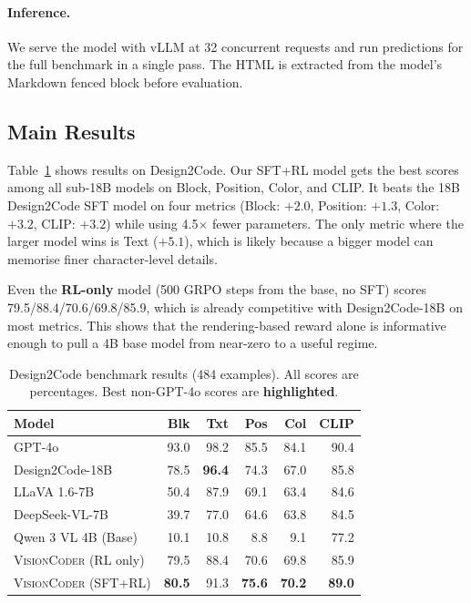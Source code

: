 \documentclass[10pt,twocolumn,letterpaper]{article}
\newcommand{\best}[1]{\textbf{\textcolor{bestcol}{#1}}}
\newcommand{\model}[1]{\textsc{#1}}
\begin{document}
\paragraph{Inference.}
We serve the model with vLLM at 32 concurrent requests and run predictions
for the full benchmark in a single pass.  The HTML is extracted from the
model's Markdown fenced block before evaluation.

\subsection{Main Results}

Table~\ref{tab:results} shows results on Design2Code.  Our SFT+RL model gets
the best scores among all sub-18B models on Block, Position, Color, and CLIP.
It beats the 18B Design2Code SFT model on four metrics (Block: $+2.0$,
Position: $+1.3$, Color: $+3.2$, CLIP: $+3.2$) while using 4.5$\times$
fewer parameters.  The only metric where the larger model wins is Text ($+5.1$),
which is likely because a bigger model can memorise finer character-level
details.

Even the \textbf{RL-only} model (500 GRPO steps from the base, no SFT)
scores 79.5/88.4/70.6/69.8/85.9, which is already competitive with
Design2Code-18B on most metrics.  This shows that the rendering-based reward
alone is informative enough to pull a 4B base model from near-zero to a
useful regime.

\begin{table}[t]
\centering
\caption{Design2Code benchmark results (484 examples). All scores are
percentages. Best non-GPT-4o scores are \best{highlighted}.}
\label{tab:results}
\renewcommand{\arraystretch}{1.1}
\setlength{\tabcolsep}{3pt}
\footnotesize
\begin{tabular}{lrrrrr}
\toprule
\textbf{Model} & \textbf{Blk} & \textbf{Txt} & \textbf{Pos} & \textbf{Col} & \textbf{CLIP} \\
\midrule
GPT-4o             & 93.0 & 98.2 & 85.5 & 84.1 & 90.4 \\
\midrule
Design2Code-18B    & 78.5 & \best{96.4} & 74.3 & 67.0 & 85.8 \\
LLaVA 1.6-7B       & 50.4 & 87.9 & 69.1 & 63.4 & 84.6 \\
DeepSeek-VL-7B     & 39.7 & 77.0 & 64.6 & 63.8 & 84.5 \\
Qwen 3 VL 4B (Base)& 10.1 & 10.8 &  8.8 &  9.1 & 77.2 \\
\midrule
\model{VisionCoder} (RL only)   & 79.5 & 88.4 & 70.6 & 69.8 & 85.9 \\
\model{VisionCoder} (SFT+RL)    & \best{80.5} & 91.3 & \best{75.6} & \best{70.2} & \best{89.0} \\
\bottomrule
\end{tabular}
\end{table}
\end{document}
